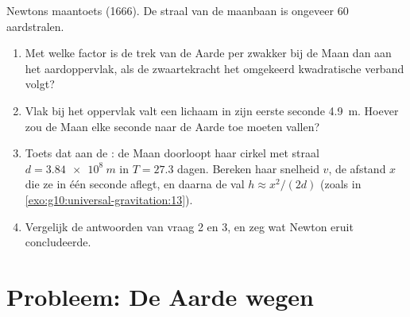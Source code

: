 \begin{exercise}[$\star\star\star$]\label{exo:g10:universal-gravitation:15}
Newtons maantoets (1666). De straal van de maanbaan is ongeveer $60$
aardstralen.
\begin{enumerate}
  \item Met welke factor is de trek van de Aarde per  zwakker bij
        de Maan dan aan het aardoppervlak, als de zwaartekracht het
        omgekeerd kwadratische verband volgt?
  \item Vlak bij het oppervlak valt een lichaam in zijn eerste seconde
        \qty{4.9}{m}. Hoever zou de Maan elke seconde naar de Aarde toe
        moeten vallen?
  \item Toets dat aan de : de Maan doorloopt haar cirkel met straal
        $d = \qty{3.84e8}{m}$ in $T = 27.3$ dagen. Bereken haar snelheid
        $v$, de afstand $x$ die ze in één seconde aflegt, en daarna de
        val $h \approx x^2/(2d)$ (zoals in
        \cref{exo:g10:universal-gravitation:13}).
  \item Vergelijk de antwoorden van vraag 2 en 3, en zeg wat Newton
        eruit concludeerde.
\end{enumerate}
\end{exercise}

\section{Probleem: De Aarde wegen}

